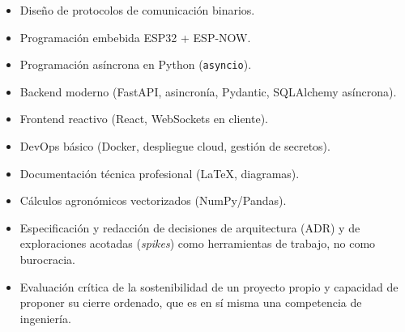 \begin{itemize}[leftmargin=*]
    \item Dise\~no de protocolos de comunicaci\'on binarios.
    \item Programaci\'on embebida ESP32 + ESP-NOW.
    \item Programaci\'on as\'incrona en Python (\texttt{asyncio}).
    \item Backend moderno (FastAPI, asincron\'ia, Pydantic, SQLAlchemy as\'incrona).
    \item Frontend reactivo (React, WebSockets en cliente).
    \item DevOps b\'asico (Docker, despliegue cloud, gesti\'on de secretos).
    \item Documentaci\'on t\'ecnica profesional (LaTeX, diagramas).
    \item C\'alculos agron\'omicos vectorizados (NumPy/Pandas).
    \item Especificaci\'on y redacci\'on de decisiones de arquitectura
    (ADR) y de exploraciones acotadas (\textit{spikes}) como herramientas
    de trabajo, no como burocracia.
    \item Evaluaci\'on cr\'itica de la sostenibilidad de un proyecto propio
    y capacidad de proponer su cierre ordenado, que es en s\'i misma una
    competencia de ingenier\'ia.
\end{itemize}
